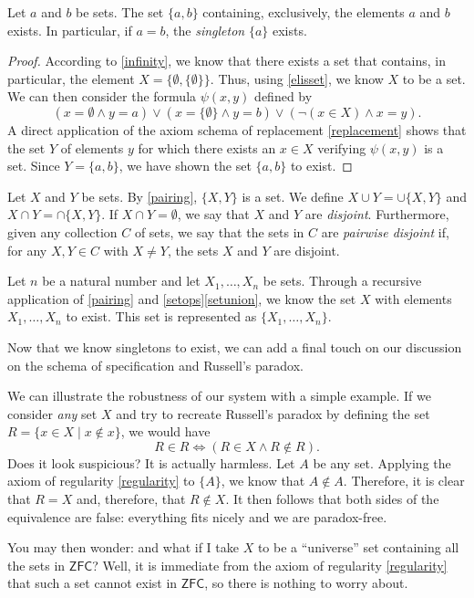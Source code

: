 \begin{proposition}[Pairing]
Let $a$ and $b$ be sets. The set $\{a,b\}$ containing, exclusively, the elements $a$ and $b$ exists. In particular, if $a=b$, the \emph{singleton} $\{a\}$ exists.
\label{pairing}
\end{proposition}

\begin{proof}
According to \ref{infinity}, we know that there exists a set that contains, in particular, the element $X = \{\emptyset, \{\emptyset\}\}$. Thus, using \ref{elisset}, we know $X$ to be a set.
We can then consider the formula $\psi(x,y)$ defined by
\[ (x = \emptyset \land y = a) \lor (x = \{\emptyset\} \land y = b) \lor (\lnot (x \in X) \land x = y).\]
A direct application of the axiom schema of replacement \ref{replacement} shows that the set $Y$ of elements $y$ for which there exists an $x\in X$ verifying $\psi(x,y)$ is a set. Since $Y = \{a,b\}$, we have shown the set $\{a,b\}$ to exist.
\end{proof}

\begin{para}[Notation]
Let $X$ and $Y$ be sets. By \ref{pairing}, $\{X,Y\}$ is a set. We define $X\cup Y = \cup\{X,Y\}$ and $X\cap Y = \cap \{X,Y\}$. 
If $X\cap Y = \emptyset$, we say that $X$ and $Y$ are \emph{disjoint}. Furthermore, given any collection $C$ of sets, we say that the sets in $C$ are \emph{pairwise disjoint} if, for any $X,Y\in C$ with $X\neq Y$, the sets $X$ and $Y$ are disjoint.


Let $n$ be a natural number and let $X_1,\ldots,X_n$ be sets. Through a recursive application of \ref{pairing} and \ref{setops}\ref{setunion}, we know the set $X$ with elements $X_1,\ldots, X_n$ to exist. This set is represented as $\{X_1,\ldots,X_n\}$.
\end{para}

\begin{para}
Now that we know singletons to exist, we can add a final touch on our discussion on the schema of specification and Russell's paradox.

We can illustrate the robustness of our system with a simple example.
If we consider \emph{any} set $X$ and try to recreate Russell's paradox by defining the set $R = \{x \in X \mid x\not\in x\}$, we would have
\[ R \in R \iff (R \in X \land R \not \in R).\]
Does it look suspicious? It is actually harmless.
Let $A$ be any set. Applying the axiom of regularity \ref{regularity} to $\{A\}$, we know that $A \not\in A$. Therefore, it is clear that $R = X$ and, therefore, that $R\not\in X$.
It then follows that both sides of the equivalence are false: everything fits nicely and we are paradox-free.

You may then wonder: and what if I take $X$ to be a ``universe'' set containing all the sets in $\mathsf{ZFC}$? Well, it is immediate from the axiom of regularity \ref{regularity} that such a set cannot exist in $\mathsf{ZFC}$, so there is nothing to worry about.
\end{para}

